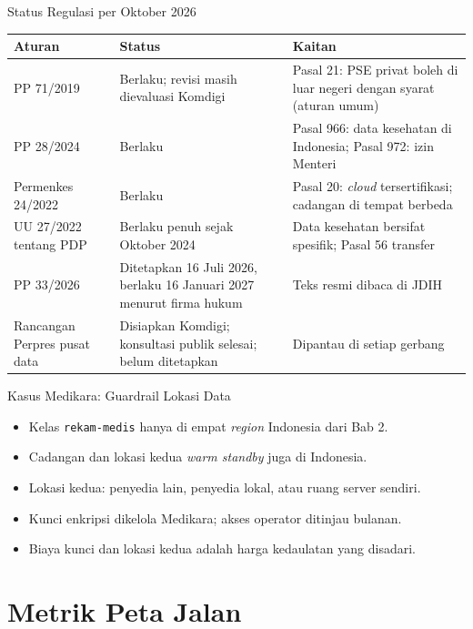 \documentclass[aspectratio=169, table, 12pt]{beamer}
\begin{document}
\begin{frame}{{\Large Status Regulasi per Oktober 2026}}
  \footnotesize
  \begin{tabularx}{\textwidth}{>{\raggedright\arraybackslash}p{3.0cm}
      >{\raggedright\arraybackslash}p{3.8cm} >{\raggedright\arraybackslash}X}
    \hline
    \textbf{Aturan} & \textbf{Status} & \textbf{Kaitan} \\ \hline
    PP 71/2019 & Berlaku; revisi masih dievaluasi Komdigi & Pasal 21: PSE privat boleh di luar
      negeri dengan syarat (aturan umum) \\ \hline
    PP 28/2024 & Berlaku & Pasal 966: data kesehatan di Indonesia; Pasal 972: izin Menteri \\ \hline
    Permenkes 24/2022 & Berlaku & Pasal 20: \textit{cloud} tersertifikasi; cadangan di tempat
      berbeda \\ \hline
    UU 27/2022 tentang PDP & Berlaku penuh sejak Oktober 2024 & Data kesehatan bersifat spesifik;
      Pasal 56 transfer \\ \hline
    PP 33/2026 & Ditetapkan 16 Juli 2026, berlaku 16 Januari 2027 menurut firma hukum & Teks resmi
      dibaca di JDIH \\ \hline
    Rancangan Perpres pusat data & Disiapkan Komdigi; konsultasi publik selesai; belum ditetapkan &
      Dipantau di setiap gerbang \\ \hline
  \end{tabularx}
\end{frame}

\begin{frame}{{\Large Kasus Medikara: Guardrail Lokasi Data}}
  \vspace{10pt}
  \begin{itemize}
    \item Kelas \texttt{rekam-medis} hanya di empat \textit{region} Indonesia dari Bab 2.
    \item Cadangan dan lokasi kedua \textit{warm standby} juga di Indonesia.
    \item Lokasi kedua: penyedia lain, penyedia lokal, atau ruang server sendiri.
    \item Kunci enkripsi dikelola Medikara; akses operator ditinjau bulanan.
    \item Biaya kunci dan lokasi kedua adalah harga kedaulatan yang disadari.
  \end{itemize}
\end{frame}

\section{Metrik Peta Jalan}
\end{document}

